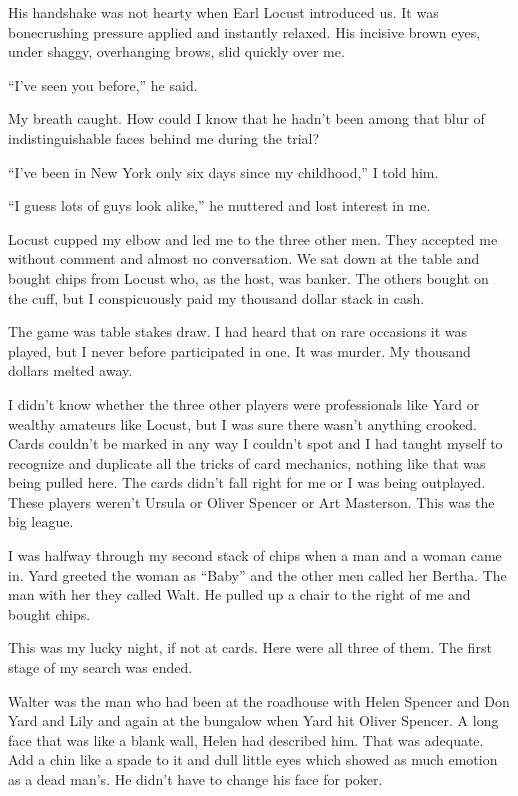 \documentclass{novel}
\begin{document}
{His handshake was not hearty when Earl Locust introduced us. It was bonecrushing pressure applied and instantly relaxed. His incisive brown eyes, under shaggy, overhanging brows, slid quickly over me.

“I’ve seen you before,” he said.

My breath caught. How could I know that he hadn’t been among that blur of indistinguishable faces behind me during the trial?

“I’ve been in New York only six days since my childhood,” I told him.

“I guess lots of guys look alike,” he muttered and lost interest in me.

Locust cupped my elbow and led me to the three other men. They accepted me without comment and almost no conversation. We sat down at the table and bought chips from Locust who, as the host, was banker. The others bought on the cuff, but I conspicuously paid my thousand dollar stack in cash.

The game was table stakes draw. I had heard that on rare occasions it was played, but I never before participated in one. It was murder. My thousand dollars melted away.

I didn’t know whether the three other players were professionals like Yard or wealthy amateurs like Locust, but I was sure there wasn’t anything crooked. Cards couldn’t be marked in any way I couldn’t spot and I had taught myself to recognize and duplicate all the tricks of card mechanics, nothing like that was being pulled here. The cards didn’t fall right for me or I was being outplayed. These players weren’t Ursula or Oliver Spencer or Art Masterson. This was the big league.

I was halfway through my second stack of chips when a man and a woman came in. Yard greeted the woman as “Baby” and the other men called her Bertha. The man with her they called Walt. He pulled up a chair to the right of me and bought chips.

This was my lucky night, if not at cards. Here were all three of them. The first stage of my search was ended.

Walter was the man who had been at the roadhouse with Helen Spencer and Don Yard and Lily and again at the bungalow when Yard hit Oliver Spencer. A long face that was like a blank wall, Helen had described him. That was adequate. Add a chin like a spade to it and dull little eyes which showed as much emotion as a dead man’s. He didn’t have to change his face for poker.

}
\end{document}
